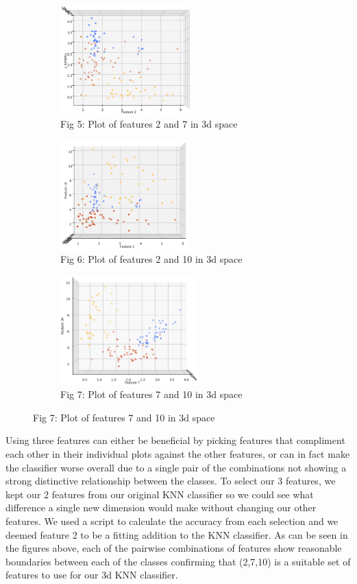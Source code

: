 \documentclass[10pt]{article}
\begin{document}
\begin{figure}[h!]
\captionsetup[subfigure]{labelformat=empty}
\begin{subfigure}{.33\textwidth}
\centering
\includegraphics[height=4.2cm]{3d2x7.png}
\caption{Fig 5: Plot of features 2 and 7 in 3d space}
\end{subfigure}%
\begin{subfigure}{.33\textwidth}
\centering
\includegraphics[height=4.2cm]{3d2x10.png}
\caption{Fig 6: Plot of features 2 and 10 in 3d space}
\end{subfigure}%
\begin{subfigure}{.33\textwidth}
\centering
\includegraphics[height=4.2cm]{3d7x10.png}
\caption{Fig 7: Plot of features 7 and 10 in 3d space}
\end{subfigure}%
\end{figure}

\noindent
Using three features can either be beneficial by picking features that compliment each other in their individual plots against the other features, or can in fact make the classifier worse overall due to a single pair of the combinations not showing a strong distinctive relationship between the classes. To select our 3 features, we kept our 2 features from our original KNN classifier so we could see what difference a single new dimension would make without changing our other features. We used a script to calculate the accuracy from each selection and we deemed feature 2 to be a fitting addition to the KNN classifier.  As can be seen in the figures above, each of the pairwise combinations of features show reasonable boundaries between each of the classes confirming that (2,7,10) is a suitable set of features to use for our 3d KNN classifier. \\
\end{document}
